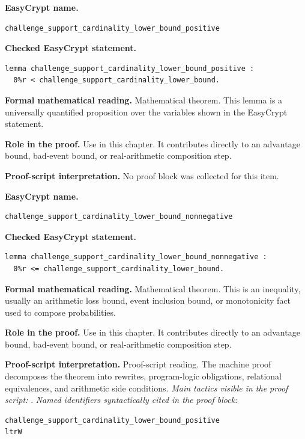 \begin{formaltheorem}
\noindent\textbf{EasyCrypt name.}
\begin{lstlisting}[language=EasyCrypt,basicstyle=\ttfamily\scriptsize]
challenge_support_cardinality_lower_bound_positive
\end{lstlisting}
\noindent\textbf{Checked EasyCrypt statement.}
\begin{lstlisting}[language=EasyCrypt,basicstyle=\ttfamily\scriptsize]
lemma challenge_support_cardinality_lower_bound_positive :
  0%r < challenge_support_cardinality_lower_bound.
\end{lstlisting}
\noindent\textbf{Formal mathematical reading.}
Mathematical theorem. This lemma is a universally quantified proposition over the variables shown in the EasyCrypt statement.

\noindent\textbf{Role in the proof.}
Use in this chapter. It contributes directly to an advantage bound, bad-event bound, or real-arithmetic composition step.

\noindent\textbf{Proof-script interpretation.}
No proof block was collected for this item.

\end{formaltheorem}

\begin{formaltheorem}
\noindent\textbf{EasyCrypt name.}
\begin{lstlisting}[language=EasyCrypt,basicstyle=\ttfamily\scriptsize]
challenge_support_cardinality_lower_bound_nonnegative
\end{lstlisting}
\noindent\textbf{Checked EasyCrypt statement.}
\begin{lstlisting}[language=EasyCrypt,basicstyle=\ttfamily\scriptsize]
lemma challenge_support_cardinality_lower_bound_nonnegative :
  0%r <= challenge_support_cardinality_lower_bound.
\end{lstlisting}
\noindent\textbf{Formal mathematical reading.}
Mathematical theorem. This is an inequality, usually an arithmetic loss bound, event inclusion bound, or monotonicity fact used to compose probabilities.

\noindent\textbf{Role in the proof.}
Use in this chapter. It contributes directly to an advantage bound, bad-event bound, or real-arithmetic composition step.

\noindent\textbf{Proof-script interpretation.}
Proof-script reading. The machine proof decomposes the theorem into rewrites, program-logic obligations, relational equivalences, and arithmetic side conditions.
\emph{Main tactics visible in the proof script:} .
\emph{Named identifiers syntactically cited in the proof block:}
\begin{lstlisting}[language=EasyCrypt,basicstyle=\ttfamily\scriptsize]
challenge_support_cardinality_lower_bound_positive
ltrW
\end{lstlisting}

\end{formaltheorem}

